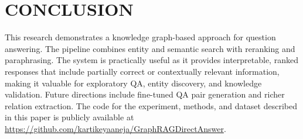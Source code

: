 \section{CONCLUSION}
This research demonstrates a knowledge graph-based approach for question answering. The pipeline combines entity and semantic search with reranking and paraphrasing. The system is practically useful as it provides interpretable, ranked responses that include partially correct or contextually relevant information, making it valuable for exploratory QA, entity discovery, and knowledge validation. Future directions include fine-tuned QA pair generation and richer relation extraction. The code for the experiment, methods, and dataset described in this paper is publicly available at \url{https://github.com/kartikeyaaneja/GraphRAGDirectAnswer}.
